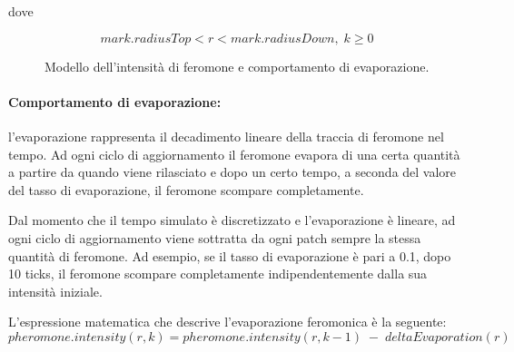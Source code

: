 dove

\begin{equation*}
    mark.radiusTop < r < mark.radiusDown , \; k \ge 0
\end{equation*}

\begin{figure}[H] 
    \captionsetup{justification=centering, margin=2cm, font=footnotesize}
    \begin{center}
    \end{center}
    \caption[short]{Modello dell'intensità di feromone e comportamento di evaporazione.}
    \label{evaporazione}
\end{figure}

\paragraph{Comportamento di evaporazione:} l’evaporazione rappresenta il decadimento lineare della traccia di feromone nel tempo. 
Ad ogni ciclo di aggiornamento il feromone evapora di una certa quantità a partire da quando viene rilasciato e dopo un certo tempo, a seconda del valore del tasso di evaporazione, il feromone scompare completamente. 

Dal momento che il tempo simulato è discretizzato e l’evaporazione è lineare, ad ogni ciclo di aggiornamento viene sottratta da ogni patch sempre la stessa quantità di feromone. 
Ad esempio, se il tasso di evaporazione è pari a 0.1, dopo 10 ticks, il feromone scompare completamente indipendentemente dalla sua intensità iniziale. 

L’espressione matematica che descrive l’evaporazione feromonica è la seguente:
\begin{equation*}
    pheromone.intensity(r,k) = pheromone.intensity(r,k-1) \; - \; deltaEvaporation(r)
\end{equation*}

